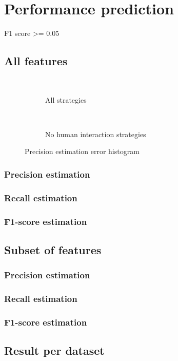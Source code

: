 \section{Performance prediction}


F1 score >= 0.05
\prntlen{\textwidth}

\subsection{All features}
\begin{figure}
     \centering
     \begin{subfigure}[b]{\textwidth}
         \centering
         
         \\
         \caption{All strategies}
         \label{fig:y equals x}
     \end{subfigure}
     \hfill
     \begin{subfigure}[b]{\textwidth}
         \centering
         
         \\
         \caption{No human interaction strategies}
         \label{fig:no_human_cost}
     \end{subfigure}
        \caption{Precision estimation error histogram}
        \label{fig:prec_estimation_hist}
\end{figure}

\subsubsection{Precision estimation}

\subsubsection{Recall estimation}

\subsubsection{F1-score estimation}

\subsection{Subset of features}
\subsubsection{Precision estimation}

\subsubsection{Recall estimation}

\subsubsection{F1-score estimation}


\subsection{Result per dataset}
